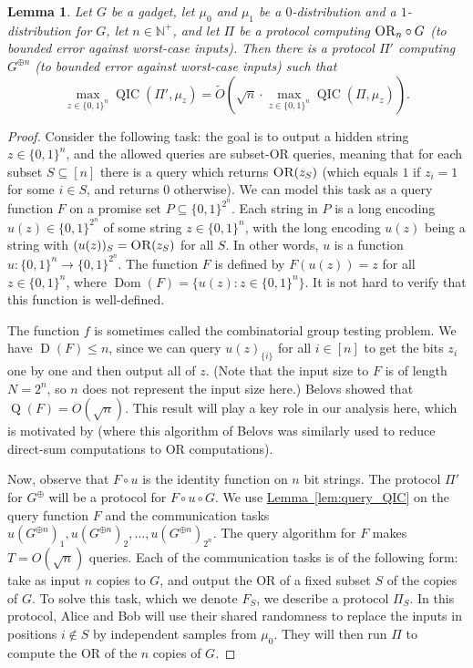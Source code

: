 \documentclass[10pt,a4paper]{article}
\newtheorem{lemma}[theorem]{Lemma}
\theoremstyle{definition}
\newcommand{\lem}[1]{\hyperref[lem:#1]{Lemma~\ref*{lem:#1}}}
\newcommand{\tO}{\tilde{O}}
\DeclareMathOperator{\Dom}{Dom}
\newcommand{\B}{\{0,1\}}
\renewcommand{\>}{\rangle}
\newcommand{\<}{\langle}
\newcommand{\OR}{\textsc{OR}}
\DeclareMathOperator{\D}{D}
\DeclareMathOperator{\Q}{Q}
\DeclareMathOperator{\QIC}{QIC}
\begin{document}
\begin{lemma}\label{lem:all_to_OR}
Let $G$ be a gadget, let $\mu_0$ and $\mu_1$ be a $0$-distribution
and a $1$-distribution for $G$, let $n\in\mathbb{N}^+$, and
let $\Pi$ be a protocol computing $\OR_n\circ G$ (to bounded
error against worst-case inputs). Then there is a protocol $\Pi'$
computing $G^{\oplus n}$
(to bounded error against worst-case inputs) such that
\[\max_{z\in\B^n}\QIC\left(\Pi',\mu_z\right)
=\tO\left(\sqrt{n}\cdot \max_{z\in\B^n}\QIC\left(\Pi,\mu_z\right)\right).\]
\end{lemma}

\begin{proof}
Consider the following task: the goal is to output
a hidden string $z\in\B^n$, and the allowed queries are subset-OR
queries, meaning that for each subset $S\subseteq[n]$ there is
a query which returns $\OR(z_S)$ (which equals $1$ if $z_i=1$ for
some $i\in S$, and returns $0$ otherwise). We can model
this task as a query function $F$ on a promise set $P\subseteq\B^{2^n}$.
Each string in $P$ is a long encoding $u(z)\in\B^{2^n}$
of some string $z\in\B^n$,
with the long encoding $u(z)$ being a string with $(u(z))_S=\OR(z_S)$
for all $S$. In other words, $u$ is a function $u\colon\B^n\to\B^{2^n}$.
The function $F$ is defined by $F(u(z))=z$ for all
$z\in\B^n$, where $\Dom(F)=\{u(z):z\in\B^n\}$.
It is not hard to verify that this function is well-defined.

The function $f$ is sometimes called the combinatorial group testing
problem. We have $\D(F)\le n$, since we can query $u(z)_{\{i\}}$
for all $i\in[n]$ to get the bits $z_i$ one by one and then output
all of $z$. (Note that the input size to $F$ is of length $N=2^n$,
so $n$ does not represent the input size here.)
Belovs \cite{Bel15} showed that $\Q(F)=O(\sqrt{n})$.
This result will play a key role in our analysis here,
which is motivated by \cite{BBGK18}
(where this algorithm of Belovs was similarly used to reduce
direct-sum computations to OR computations).

Now, observe that $F\circ u$ is the identity function on $n$ bit strings.
The protocol $\Pi'$ for $G^{\oplus}$ will be a protocol
for $F\circ u\circ G$. We use \lem{query_QIC}
on the query function $F$ and the communication tasks
$u(G^{\oplus n})_1,u(G^{\oplus n})_2,\dots,u(G^{\oplus n})_{2^n}$.
The query algorithm for $F$ makes $T=O(\sqrt{n})$ queries.
Each of the communication tasks is of the following form:
take as input $n$ copies to $G$, and output the OR
of a fixed subset $S$ of the copies of $G$. To solve this task,
which we denote $F_S$, we describe a protocol $\Pi_S$.
In this protocol, Alice and Bob will use their shared randomness
to replace the inputs in positions $i\notin S$ by independent
samples from $\mu_0$. They will then run $\Pi$ to compute the OR
of the $n$ copies of $G$.


\end{proof}
\end{document}

